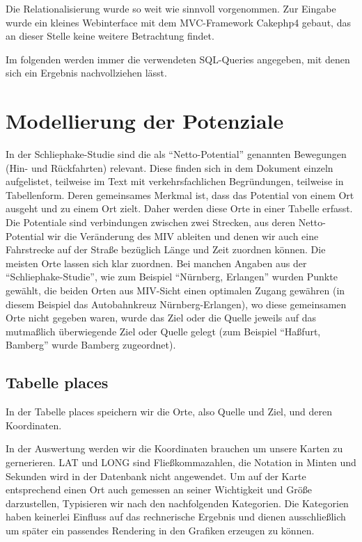 \documentclass[fontsize=12pt,a4paper]{scrreprt}
\begin{document}
Die Relationalisierung wurde so weit wie sinnvoll vorgenommen. Zur Eingabe wurde ein kleines Webinterface mit dem MVC-Framework Cakephp4 gebaut, das an dieser Stelle keine weitere Betrachtung findet.

Im folgenden werden immer die verwendeten SQL-Queries angegeben, mit denen sich ein Ergebnis nachvollziehen lässt.

\section{Modellierung der Potenziale}
In der Schliephake-Studie sind die als \enquote{Netto-Potential} genannten Bewegungen (Hin- und Rückfahrten) relevant. Diese finden sich in dem Dokument einzeln aufgelistet, teilweise im Text mit verkehrsfachlichen Begründungen, teilweise in Tabellenform.\newline
\newline
Deren gemeinsames Merkmal ist, dass das Potential von einem Ort ausgeht und zu einem Ort zielt. Daher werden diese Orte in einer Tabelle erfasst.\newline
\newline
Die Potentiale sind verbindungen zwischen zwei Strecken, aus deren Netto-Potential wir die Veränderung des MIV ableiten und denen wir auch eine Fahrstrecke auf der Straße bezüglich Länge und Zeit zuordnen können.\newline
\newline
Die meisten Orte lassen sich klar zuordnen. Bei manchen Angaben aus der \enquote{Schliephake-Studie}, wie zum Beispiel \enquote{Nürnberg, Erlangen} wurden Punkte gewählt, die beiden Orten aus MIV-Sicht einen optimalen Zugang gewähren (in diesem Beispiel das Autobahnkreuz Nürnberg-Erlangen), wo diese gemeinsamen Orte nicht gegeben waren, wurde das Ziel oder die Quelle jeweils auf das mutmaßlich überwiegende Ziel oder Quelle gelegt (zum Beispiel \enquote{Haßfurt, Bamberg} wurde Bamberg zugeordnet).

\subsection{Tabelle places}
In der Tabelle places speichern wir die Orte, also Quelle und Ziel, und deren Koordinaten.

In der Auswertung werden wir die Koordinaten brauchen um unsere Karten zu gernerieren. LAT und LONG sind Fließkommazahlen, die Notation in Minten und Sekunden wird in der Datenbank nicht angewendet.
Um auf der Karte entsprechend einen Ort auch gemessen an seiner Wichtigkeit und Größe darzustellen, Typisieren wir nach den nachfolgenden Kategorien.
Die Kategorien haben keinerlei Einfluss auf das rechnerische Ergebnis und dienen ausschließlich um später ein passendes Rendering in den Grafiken erzeugen zu können.
\end{document}

